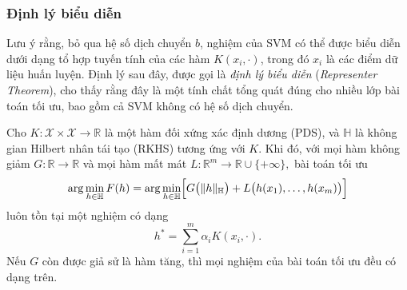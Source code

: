 \subsubsection{Định lý biểu diễn}

Lưu ý rằng, bỏ qua hệ số dịch chuyển $b$, nghiệm của SVM
có thể được biểu diễn dưới dạng tổ hợp tuyến tính của các hàm
$K(x_i,\cdot)$, trong đó $x_i$ là các điểm dữ liệu huấn luyện.
Định lý sau đây, được gọi là \emph{định lý biểu diễn}
(\emph{Representer Theorem}), cho thấy rằng đây là một tính chất
tổng quát đúng cho nhiều lớp bài toán tối ưu,
bao gồm cả SVM không có hệ số dịch chuyển.

\begin{thm}
\label{thm:representer}

Cho
$
K\colon \mathcal{X}\times\mathcal{X}\to\mathbb{R}
$
là một hàm \protect{} đối xứng xác định dương (PDS),
và $\mathbb{H}$ là không gian Hilbert nhân tái tạo
(RKHS) tương ứng với $K$.
Khi đó, với mọi hàm không giảm
$
G\colon \mathbb{R}\to\mathbb{R}
$
và mọi hàm mất mát
$
L\colon \mathbb{R}^{m}\to\mathbb{R}\cup\{+\infty\},
$
bài toán tối ưu
\begin{equation}
\arg\min_{h\in\mathbb{H}} F(h)
=
\arg\min_{h\in\mathbb{H}}
\Bigl[
G\bigl(\|h\|_{\mathbb{H}}\bigr)
+
L\bigl(h(x_1),\dots,h(x_m)\bigr)
\Bigr]
\end{equation}
luôn tồn tại một nghiệm có dạng
\begin{equation}
h^{*}
=
\sum_{i=1}^{m}
\alpha_i K(x_i,\cdot).
\end{equation}
Nếu $G$ còn được giả sử là hàm tăng,
thì mọi nghiệm của bài toán tối ưu
đều có dạng trên.
\end{thm}

